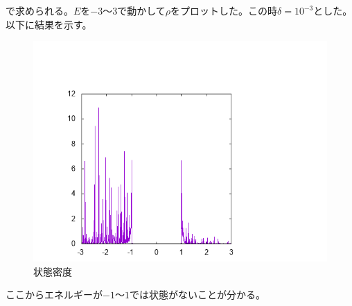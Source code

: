 \documentclass{jarticle}
\begin{document}
で求められる。$E$を$-3$〜$3$で動かして$\rho$をプロットした。この時$\delta=10^{-3}$とした。
以下に結果を示す。
\begin{figure}[H]
	\centering
	\includegraphics[scale=0.7]{../../16/KS/16-2/graph/data.png}
	\caption{状態密度}
\end{figure}
ここからエネルギーが$-1$〜$1$では状態がないことが分かる。
\end{document}
